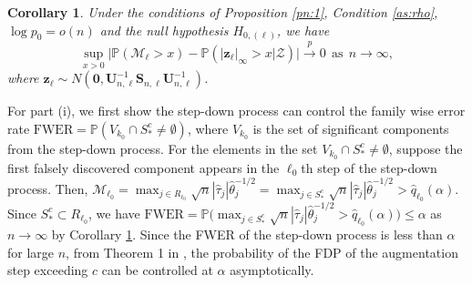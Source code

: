 \documentclass[12pt]{article}
\newtheorem{cy}{Corollary}%
\theoremstyle{definition}
\newcommand{\bS}{{\mathbf S}}
\newcommand{\bU}{{\mathbf U}}
\newcommand{\bz}{{\mathbf z}}
\newcommand{\bzero}{{\mathbf 0}}
\begin{document}
\begin{cy}\label{pn:3}
Under the conditions of Proposition \ref{pn:1}, Condition \ref{as:rho}, $\log p_0 = o(n)$ and the null hypothesis $H_{0, (\ell)}$, we have
\[
\sup_{x>0}\big|\mathbb{P}(\mathcal{M}_{\ell}  > x ) - \mathbb{P}(|\bz_{\ell}|_{\infty} > x| \mathcal{Z})\big|\xrightarrow{p}0~~\textrm{as}~~n\rightarrow\infty,
\]
where $\bz_{\ell} \sim N(\bzero, \bU_{n, \ell}^{-1} \bS_{n, \ell} \bU_{n, \ell}^{-1})$. 
\end{cy}

\medskip
{}
For part (i), we first show the step-down process can control the family wise error rate $\mbox{FWER} = \mathbb{P}(V_{k_0} \cap S_{\ast}^{c} \neq \emptyset)$, where $V_{k_0}$ is the set of significant components from the step-down process.
For the elements in the set $V_{k_0} \cap S_{\ast}^{c} \neq \emptyset$, suppose the first falsely discovered component appears in the $\ell_0$th step of the step-down process.
Then, $\mathcal{M}_{\ell_0} = \max_{j \in R_{\ell_0}} \sqrt{n}|\hat{\tau}_{j}| \hat{\theta}_{j}^{-1/2} = \max_{j \in S_{\ast}^{c}} \sqrt{n}|\hat{\tau}_{j}| \hat{\theta}_{j}^{-1/2} > \hat{q}_{\ell_0}(\alpha)$.
Since $S_{\ast}^{c} \subset R_{\ell_0}$, we have $\mbox{FWER} = \mathbb{P}\big( \max_{j \in S^{c}_{\ast}} \sqrt{n}|\hat{\tau}_{j}| \hat{\theta}_{j}^{-1/2} > \hat{q}_{\ell_0}(\alpha) \big) \leq \alpha$ as $n \to \infty$ by Corollary \ref{pn:3}.
Since the FWER of the step-down process is less than $\alpha$ for large $n$, from Theorem 1 in \cite{GW_2006}, the probability of the FDP of the augmentation step exceeding $c$ can be controlled at $\alpha$ asymptotically.
\end{document}
